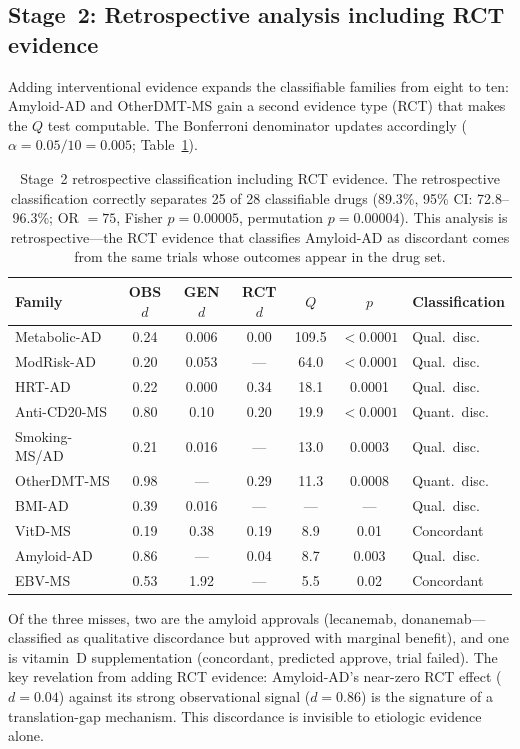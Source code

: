 \documentclass[11pt]{article}
\begin{document}
\subsection{Stage~2: Retrospective analysis including RCT evidence}
\label{sec:stage2}

Adding interventional evidence expands the classifiable families from eight to ten: Amyloid-AD and OtherDMT-MS gain a second evidence type (RCT) that makes the $Q$ test computable. The Bonferroni denominator updates accordingly ($\alpha = 0.05/10 = 0.005$; Table~\ref{tab:stage2}).

\begin{table}[t]
\centering
\caption{Stage~2 retrospective classification including RCT evidence. The retrospective classification correctly separates 25 of 28 classifiable drugs (89.3\%, 95\% CI: 72.8--96.3\%; OR $= 75$, Fisher $p = 0.00005$, permutation $p = 0.00004$). This analysis is retrospective---the RCT evidence that classifies Amyloid-AD as discordant comes from the same trials whose outcomes appear in the drug set.}
\label{tab:stage2}
\begin{tabular}{lcccccl}
\toprule
Family & OBS $d$ & GEN $d$ & RCT $d$ & $Q$ & $p$ & Classification \\
\midrule
Metabolic-AD & 0.24 & 0.006 & 0.00 & 109.5 & $< 0.0001$ & Qual.\ disc. \\
ModRisk-AD & 0.20 & 0.053 & --- & 64.0 & $< 0.0001$ & Qual.\ disc. \\
HRT-AD & 0.22 & 0.000 & 0.34 & 18.1 & 0.0001 & Qual.\ disc. \\
Anti-CD20-MS & 0.80 & 0.10 & 0.20 & 19.9 & $< 0.0001$ & Quant.\ disc. \\
Smoking-MS/AD & 0.21 & 0.016 & --- & 13.0 & 0.0003 & Qual.\ disc. \\
OtherDMT-MS & 0.98 & --- & 0.29 & 11.3 & 0.0008 & Quant.\ disc. \\
BMI-AD & 0.39 & 0.016 & --- & --- & --- & Qual.\ disc. \\
VitD-MS & 0.19 & 0.38 & 0.19 & 8.9 & 0.01 & Concordant \\
Amyloid-AD & 0.86 & --- & 0.04 & 8.7 & 0.003 & Qual.\ disc. \\
EBV-MS & 0.53 & 1.92 & --- & 5.5 & 0.02 & Concordant \\
\bottomrule
\end{tabular}
\end{table}

Of the three misses, two are the amyloid approvals (lecanemab, donanemab---classified as qualitative discordance but approved with marginal benefit), and one is vitamin~D supplementation (concordant, predicted approve, trial failed). The key revelation from adding RCT evidence: Amyloid-AD's near-zero RCT effect ($d = 0.04$) against its strong observational signal ($d = 0.86$) is the signature of a translation-gap mechanism. This discordance is invisible to etiologic evidence alone.
\end{document}
